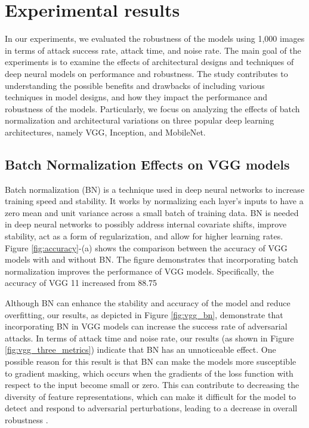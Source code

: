 \section{Experimental results} 
\label{sec:experiment_results} 
In our experiments, we evaluated the robustness of the models using 1,000 images in terms of attack success rate, attack time, and noise rate. The main goal of the experiments is to examine the effects of architectural designs and techniques of deep neural models on performance and robustness. The study contributes to understanding the possible benefits and drawbacks of including various techniques in model designs, and how they impact the performance and robustness of the models. Particularly, we focus on analyzing the effects of batch normalization and architectural variations on three popular deep learning architectures, namely VGG, Inception, and MobileNet. 


\subsection{Batch Normalization Effects on VGG models} 



Batch normalization (BN) is a technique used in deep neural networks to increase training speed and stability. It works by normalizing each layer's inputs to have a zero mean and unit variance across a small batch of training data. BN is needed in deep neural networks to possibly address internal covariate shifts, improve stability, act as a form of regularization, and allow for higher learning rates.
Figure \ref{fig:accuracy}-(a) shows the comparison between the accuracy of VGG models with and without BN. The figure demonstrates that incorporating batch normalization improves the performance of VGG models. Specifically, the accuracy of VGG 11 increased from 88.75\

Although BN can enhance the stability and accuracy of the model and reduce overfitting, our results, as depicted in Figure \ref{fig:vgg_bn}, demonstrate that incorporating BN in VGG models can increase the success rate of adversarial attacks. 
In terms of attack time and noise rate, our results (as shown in Figure \ref{fig:vgg_three_metrics}) indicate that BN has an unnoticeable effect. 
One possible reason for this result is that BN can make the models more susceptible to gradient masking, which occurs when the gradients of the loss function with respect to the input become small or zero. This can contribute to decreasing the diversity of feature representations, which can make it difficult for the model to detect and respond to adversarial perturbations, leading to a decrease in overall robustness \cite{boenisch2021gradient}.

